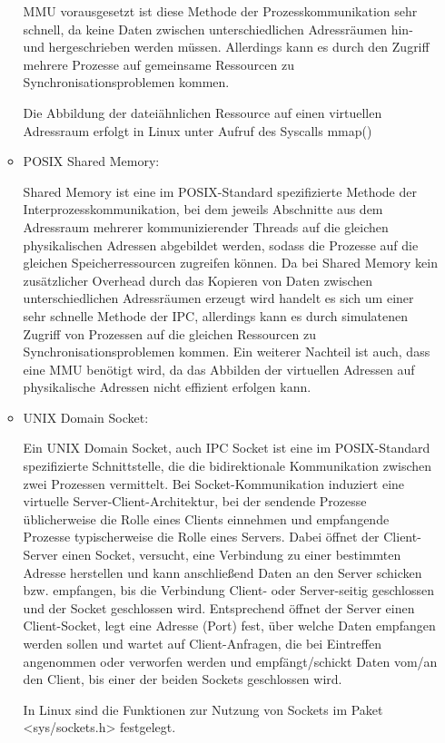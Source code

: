 \documentclass[numbers=noendperiod]{scrartcl}
\begin{document}
\begin{enumerate}[a)]
\begin{itemize}
		MMU vorausgesetzt ist diese Methode der Prozesskommunikation sehr schnell, da keine Daten zwischen unterschiedlichen Adressräumen hin- und hergeschrieben werden müssen. Allerdings kann es durch den Zugriff
		mehrere Prozesse auf gemeinsame Ressourcen zu Synchronisationsproblemen kommen.
		
		Die Abbildung der dateiähnlichen Ressource auf einen virtuellen Adressraum erfolgt in Linux unter Aufruf des Syscalls mmap()
		
		\item POSIX Shared Memory:
		
		Shared Memory ist eine im POSIX-Standard spezifizierte Methode der Interprozesskommunikation, bei dem jeweils Abschnitte aus dem Adressraum mehrerer kommunizierender
		Threads auf die gleichen physikalischen Adressen abgebildet werden, sodass die Prozesse auf die gleichen Speicherressourcen zugreifen können. Da bei Shared Memory kein
		zusätzlicher Overhead durch das Kopieren von Daten zwischen unterschiedlichen Adressräumen erzeugt wird handelt es sich um einer sehr schnelle Methode der IPC, allerdings
		kann es durch simulatenen Zugriff von Prozessen auf die gleichen Ressourcen zu Synchronisationsproblemen kommen. Ein weiterer Nachteil ist auch, dass eine MMU benötigt wird, da
		das Abbilden der virtuellen Adressen auf physikalische Adressen nicht effizient erfolgen kann.
		
		
		\item UNIX Domain Socket:
		
		Ein UNIX Domain Socket, auch IPC Socket ist eine im POSIX-Standard spezifizierte Schnittstelle, die die bidirektionale Kommunikation zwischen zwei Prozessen
		vermittelt. Bei Socket-Kommunikation induziert eine virtuelle Server-Client-Architektur, bei der sendende Prozesse üblicherweise die Rolle eines Clients einnehmen
		und empfangende Prozesse typischerweise die Rolle eines Servers. Dabei öffnet der Client-Server einen Socket, versucht, eine Verbindung zu einer bestimmten Adresse herstellen und 
		kann anschließend Daten an den Server schicken bzw. empfangen, bis die Verbindung Client- oder Server-seitig geschlossen und der Socket geschlossen wird.
		Entsprechend öffnet der Server einen Client-Socket, legt eine Adresse (Port) fest, über welche Daten empfangen werden sollen und wartet auf Client-Anfragen, die bei Eintreffen angenommen oder verworfen werden und empfängt/schickt
		Daten vom/an den Client, bis einer der beiden Sockets geschlossen wird.
		
		In Linux sind die Funktionen zur Nutzung von Sockets im Paket <sys/sockets.h> festgelegt.
	\end{itemize}
	

\end{enumerate}
\end{document}

